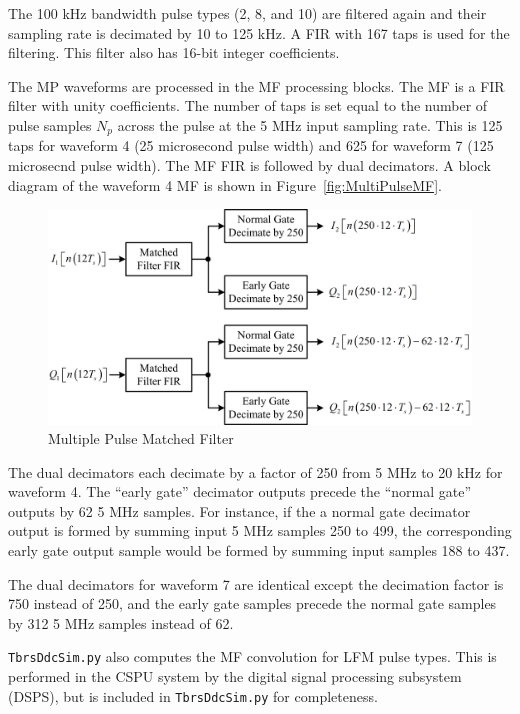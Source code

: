 \documentclass[12pt,english]{article}
\begin{document}
The 100 kHz bandwidth pulse types (2, 8, and 10) are filtered again
and their sampling rate is decimated by 10 to 125 kHz. A FIR with 167
taps is used for the filtering. This filter also has 16-bit integer
coefficients.

The MP waveforms are processed in the MF processing blocks. The MF is
a FIR filter with unity coefficients. The number of taps is set equal
to the number of pulse samples $N_p$ across the pulse at the 5 MHz
input sampling rate. This is 125 taps for waveform 4 (25 microsecond
pulse width) and 625 for waveform 7 (125 microsecnd pulse width). The
MF FIR is followed by dual decimators. A block diagram of the waveform
4 MF is shown in Figure~\vref{fig:MultiPulseMF}.

\begin{figure}[ht]
  \noindent \begin{centering}
  \includegraphics[width=5.0in]{MultiPulseMF.png}\medskip{}
  \caption{Multiple Pulse Matched Filter}
  \label{fig:MultiPulseMF}
  \par \end{centering}
\end{figure}

The dual decimators each decimate by a factor of 250 from 5 MHz to 20
kHz for waveform 4. The ``early gate'' decimator outputs precede the
``normal gate'' outputs by 62 5 MHz samples. For instance, if the a
normal gate decimator output is formed by summing input 5 MHz samples
250 to 499, the corresponding early gate output sample would be formed
by summing input samples 188 to 437.

The dual decimators for waveform 7 are identical except the decimation
factor is 750 instead of 250, and the early gate samples precede the
normal gate samples by 312 5 MHz samples instead of 62.

\texttt{TbrsDdcSim.py} also computes the MF convolution for LFM pulse
types. This is performed in the CSPU system by the digital signal
processing subsystem (DSPS), but is included in
\texttt{TbrsDdcSim.py} for completeness.
\end{document}
